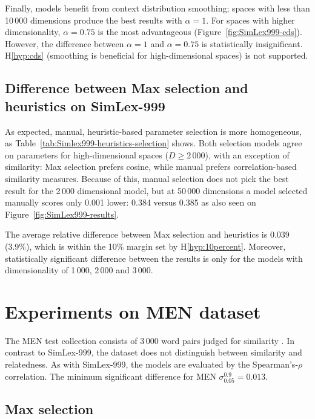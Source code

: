 Finally, models benefit from context distribution smoothing; spaces with less than 10\,000 dimensions produce the best results with $\alpha = 1$. For spaces with higher dimensionality, $\alpha = 0.75$ is the most advantageous (Figure~\ref{fig:SimLex999-cds}). However, the difference between $\alpha = 1$ and $\alpha = 0.75$ is statistically insignificant. H\ref{hyp:cds} (smoothing is beneficial for high-dimensional spaces) is not supported.

\subsection{Difference between Max selection and heuristics on SimLex-999}

As expected, manual, heuristic-based parameter selection is more homogeneous, as Table~\ref{tab:Simlex999-heuristics-selection} shows. Both selection models agree on parameters for high-dimensional spaces ($D \geq 2\,000$), with an exception of similarity: Max selection prefers cosine, while manual prefers correlation-based similarity measures. Because of this, manual selection does not pick the best result for the 2\,000 dimensional model, but at 50\,000 dimensions a model selected manually scores only 0.001 lower: 0.384 versus 0.385 as also seen on Figure~\ref{fig:SimLex999-results}.

The average relative difference between Max selection and heuristics is 0.039 (3.9\%), which is within the 10\% margin set by H\ref{hyp:10percent}. Moreover, statistically significant difference between the results is only for the models with dimensionality of 1\,000, 2\,000 and 3\,000.

\section{Experiments on MEN dataset}
\label{sec:men}



The MEN test collection consists of 3\,000 word pairs judged for similarity \cite{Bruni:2014:MDS:2655713.2655714}. In contrast to SimLex-999, the dataset does not distinguish between similarity and relatedness. As with SimLex-999, the models are evaluated by the Spearman's-$\rho$ correlation. The minimum significant difference for MEN $\sigma^{0.9}_{0.05} = 0.013$.

\subsection{Max selection}
\label{sec:max-selection-men}

